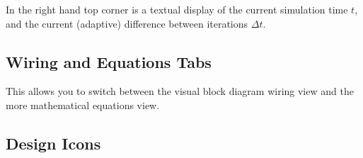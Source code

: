 \label{SimTime}

In the right hand top corner is a textual display of the current simulation
time $t$, and the current (adaptive) difference between iterations
$\Delta t$.

\subsection{Wiring and Equations Tabs}

\label{WiringEquationsTab}


This allows you to switch between the visual block diagram wiring
view and the more mathematical equations view.

\subsection{Design Icons}


